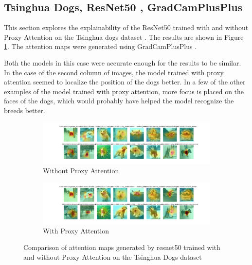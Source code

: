 \subsection{Tsinghua Dogs, ResNet50 , GradCamPlusPlus}
This section explores the explainability of the ResNet50 \cite{heDeepResidualLearning2016} trained with and without Proxy Attention on the Tsinghua dogs dataset \cite{zouNewDatasetDog2020}. The results are shown in Figure \ref{fig:resnet50_tsing}. The attention maps were generated using GradCamPlusPlus \cite{chattopadhayGradCAMGeneralizedGradientBased2018}.

Both the models in this case were accurate enough for the results to be similar. In the case of the second column of images, the model trained with proxy attention seemed to localize the position of the dogs better.  In a few of the other examples of the model trained with proxy attention, more focus is placed on the faces of the dogs, which would probably have helped the model recognize the breeds better.

\begin{figure}[!htb]
    \begin{subfigure}[b]{1\textwidth}
        \includegraphics[width=\linewidth]{images/gpp_tsing_resnet50_noproxy_0.pdf}
        \caption{Without Proxy Attention}
    \end{subfigure}
    \begin{subfigure}[b]{1\textwidth}
        \includegraphics[width=\linewidth]{images/gpp_tsing_resnet50_proxy_0.pdf}
        \caption{With Proxy Attention}
    \end{subfigure}
    \caption{Comparison of attention maps generated by resnet50 trained with and without Proxy Attention on the Tsinghua Dogs dataset}
    \label{fig:resnet50_tsing}
\end{figure}


